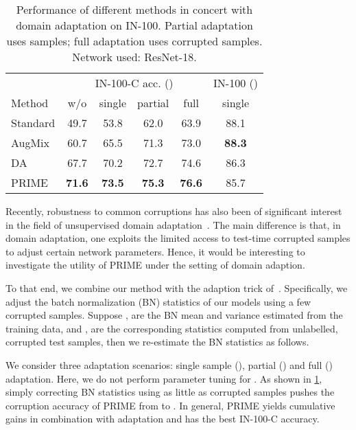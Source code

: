 \documentclass[runningheads]{llncs}
\begin{document}
\begin{table}[ht]
    \centering
    \footnotesize
    \caption{Performance of different methods in concert with domain adaptation on IN-100. Partial adaptation uses  samples; full adaptation uses  corrupted samples. Network used: ResNet-18.}
    \begin{tabular}{lccccc}
        \toprule
        & \multicolumn{4}{c}{IN-100-C acc. ()} & IN-100 ()\\
        \cmidrule{2-6}
        Method & w/o & single & partial & full & single\\
        \midrule
        Standard & 49.7 & 53.8 & 62.0 & 63.9 & 88.1\\
        AugMix & 60.7 & 65.5 & 71.3 & 73.0 & \textbf{88.3}\\
        DA & 67.7 & 70.2 & 72.7 & 74.6 & 86.3\\
        PRIME & \textbf{71.6} & \textbf{73.5} & \textbf{75.3} & \textbf{76.6} & 85.7\\
        \bottomrule
    \end{tabular}
    \vspace*{-2mm}
    \label{tab:bn-adapt}
\end{table}

Recently, robustness to common corruptions has also been of significant interest in the field of unsupervised domain adaptation~\cite{bnadapt_so2021,bnadapt_bethge2021}. The main difference is that, in domain adaptation, one exploits the limited access to test-time corrupted samples to adjust certain network parameters. Hence, it would be interesting to investigate the utility of PRIME under the setting of domain adaption. 

To that end, we combine our method with the adaption trick of~\cite{bnadapt_bethge2021}. Specifically, we adjust the batch normalization (BN) statistics of our models using a few corrupted samples. Suppose ,  are the BN mean and variance estimated from the training data, and ,  are the corresponding statistics computed from  unlabelled, corrupted test samples, then we re-estimate the BN statistics as follows.

We consider three adaptation scenarios: single sample (), partial () and full () adaptation. Here, we do not perform parameter tuning for . As shown in \cref{tab:bn-adapt}, simply correcting BN statistics using as little as  corrupted samples pushes the corruption accuracy of PRIME from  to . In general, PRIME yields cumulative gains in combination with adaptation and has the best IN-100-C accuracy.
\end{document}
